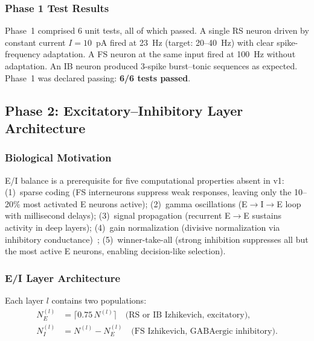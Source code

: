 \documentclass[11pt,a4paper]{article}
\begin{document}
\subsubsection{Phase 1 Test Results}

Phase~1 comprised 6 unit tests, all of which passed.
A single RS neuron driven by constant current $I = 10$~pA fired at
23~Hz (target: 20--40~Hz) with clear spike-frequency adaptation.
A FS neuron at the same input fired at 100~Hz without adaptation.
An IB neuron produced 3-spike burst--tonic sequences as expected.
Phase~1 was declared passing: \textbf{6/6 tests passed}.

\subsection{Phase 2: Excitatory--Inhibitory Layer Architecture}\label{sec:phase2}

\subsubsection{Biological Motivation}

E/I balance is a prerequisite for five computational properties
absent in v1:
(1)~sparse coding (FS interneurons suppress weak responses, leaving
only the 10--20\% most activated E neurons active);
(2)~gamma oscillations (E$\to$I$\to$E loop with millisecond delays);
(3)~signal propagation (recurrent E$\to$E sustains activity in deep layers);
(4)~gain normalization (divisive normalization via inhibitory
conductance)~\cite{carandini2012};
(5)~winner-take-all (strong inhibition suppresses all but the most
active E neurons, enabling decision-like selection).

\subsubsection{E/I Layer Architecture}

Each layer $l$ contains two populations:
\begin{equation}\label{eq:ei_layer}
\begin{aligned}
  N_E^{(l)} &= \lceil 0.75\,N^{(l)} \rceil
    \quad \text{(RS or IB Izhikevich, excitatory)}, \\
  N_I^{(l)} &= N^{(l)} - N_E^{(l)}
    \quad \text{(FS Izhikevich, GABAergic inhibitory)}.
\end{aligned}
\end{equation}
\end{document}
